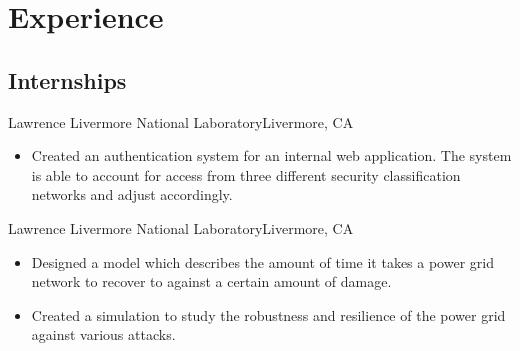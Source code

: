 \documentclass[12pt,a4paper,roman]{moderncv}        %
\begin{document}

\vspace{2pt}


\section{Experience}



\vspace{5pt}

\subsection{Internships}

{Lawrence Livermore National Laboratory}{Livermore, CA}{}{}

\begin{itemize}
	\item Created an authentication system for an internal web application. The system is able to account for access from three different security classification networks and adjust accordingly. 
\end{itemize}

\vspace{5pt}

{Lawrence Livermore National Laboratory}{Livermore, CA}{}{}

\begin{itemize}
    \item Designed a model which describes the amount of time it takes a power grid network to recover to against a certain amount of damage.

	\item Created a simulation to study the robustness and resilience of the power grid against various attacks.
\end{itemize}

\vspace{5pt}
\end{document}
